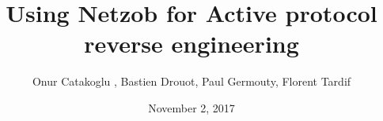\documentclass{beamer}
\newcounter{m} %
\newcounter{c} %
\begin{document}




\title{Using Netzob for Active protocol reverse engineering }   
\author{Onur Catakoglu , Bastien Drouot, Paul Germouty, Florent Tardif} 
\date{November 2, 2017} 



\end{document}

